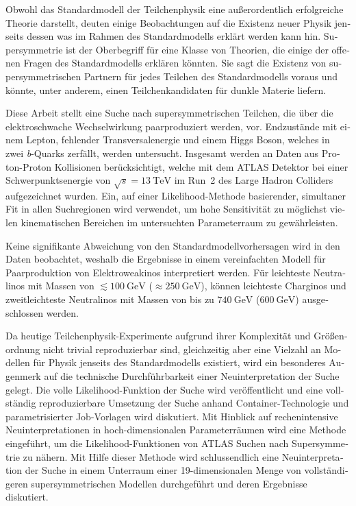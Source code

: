 
\begin{otherlanguage}{ngerman} 
\begin{zusammenfassung}

Obwohl das Standardmodell der Teilchenphysik eine außerordentlich erfolgreiche Theorie darstellt, deuten einige Beobachtungen auf die Existenz neuer Physik jenseits dessen was im Rahmen des Standardmodells erklärt werden kann hin.
Supersymmetrie ist der Oberbegriff für eine Klasse von Theorien, die einige der offenen Fragen des Standardmodells erklären könnten.
Sie sagt die Existenz von supersymmetrischen Partnern für jedes Teilchen des Standardmodells voraus und könnte, unter anderem, einen Teilchenkandidaten für dunkle Materie liefern. 

Diese Arbeit stellt eine Suche nach supersymmetrischen Teilchen, die über die elektroschwache Wechsel\-wirkung paarproduziert werden, vor.
Endzustände mit einem Lepton, fehlender Transversalenergie und einem Higgs Boson, welches in zwei \textit{b}-Quarks zerfällt, werden untersucht.
Insgesamt werden \onethirtynineifb an Daten aus Proton-Proton Kollisionen berücksichtigt, welche mit dem ATLAS Detektor bei einer Schwerpunktsenergie von $\sqrt{s}=\SI{13}{\TeV}$ im Run~2 des Large Hadron Colliders aufgezeichnet wurden.
Ein, auf einer Likelihood-Methode basierender, simultaner Fit in allen Suchregionen wird verwendet, um hohe Sensitivität zu möglichst vielen kinematischen Bereichen im untersuchten Parameterraum zu gewährleisten.

Keine signifikante Abweichung von den Standardmodellvorhersagen wird in den Daten beobachtet, weshalb die Ergebnisse in einem vereinfachten Modell für Paarproduktion von Elektro\-weakinos interpretiert werden.
Für leichteste Neutralinos mit Massen von $\lesssim \SI{100}{\GeV}$ ($\approx\SI{250}{\GeV}$), können leichteste Charginos und zweitleichteste Neutralinos mit Massen von bis zu $\SI{740}{\GeV}$ ($\SI{600}{\GeV}$) ausgeschlossen werden.

Da heutige Teilchenphysik-Experimente aufgrund ihrer Komplexität und Größenordnung nicht trivial reproduzierbar sind, gleichzeitig aber eine Vielzahl an Modellen für Physik jenseits des Standardmodells existiert, wird ein besonderes Augenmerk auf die technische Durchführbarkeit einer Neuinterpretation der Suche gelegt.
Die volle Likelihood-Funktion der Suche wird veröffentlicht und eine vollständig reproduzierbare Umsetzung der Suche anhand Container-Technologie und parametrisierter Job-Vorlagen wird diskutiert.
Mit Hinblick auf rechenintensive Neuinterpretationen in hoch-dimensionalen Parameter\-räumen wird eine Methode eingeführt, um die Likelihood-Funktionen von ATLAS Suchen nach Supersymmetrie zu nähern.
Mit Hilfe dieser Methode wird schlussendlich eine Neuinterpretation der Suche in einem Unterraum einer 19-dimensionalen Menge von vollständigeren supersymmetrischen Modellen durchgeführt und deren Ergebnisse diskutiert. 


\end{zusammenfassung}
\end{otherlanguage}
